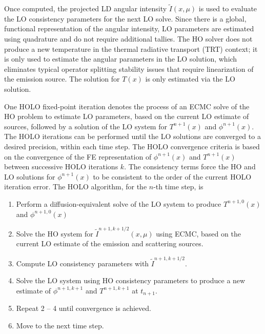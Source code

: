 \documentclass{mc2013}
\begin{document}


Once computed, the projected LD
angular intensity $\tilde{I}(x,\mu)$ is used to evaluate the LO
consistency parameters for the next LO solve.  Since there is a global, functional representation of
the angular intensity,  LO parameters are estimated using quadrature and do not require additional tallies.  The HO solver does not
produce a new temperature in the thermal radiative transport (TRT) context; it is
only used to estimate the angular parameters in the LO solution, which eliminates
typical operator splitting stability issues that require linearization of the emission source.
 The solution for $T(x)$ is only estimated via the LO solution.

One HOLO fixed-point iteration denotes the process of an ECMC solve of the HO problem to estimate LO parameters, based on
the current LO estimate of sources, followed by a solution of the 
LO system for $T^{n+1}(x)$ and $\phi^{n+1}(x)$.
The HOLO iterations can be performed until the LO solutions are converged to a
desired precision, within each time step. The HOLO convergence criteria is based on
the convergence of the FE representation of $\phi^{n+1}(x)$ and $T^{n+1}(x)$ between successive HOLO iterations
$k$.  
The consistency terms force the HO
and LO solutions for $\phi^{n+1}(x)$ to be consistent to the order of the current HOLO
iteration error.   The HOLO algorithm, for the $n$-th time step, is
\begin{enumerate}
    \item Perform a diffusion-equivalent solve of the LO system to produce $T^{n+1,0}(x)$
        and $\phi^{n+1,0}(x)$ 
\item Solve the HO system for $\tilde{I}^{n+1,k+1/2}(x,\mu)$ using ECMC, based on the current
    LO estimate of the emission and scattering sources.%
\item Compute LO consistency parameters with $\tilde{I}^{n+1,k+1/2}$.  
\item Solve the LO system using HO consistency parameters to produce a new
    estimate of $\phi^{n+1,k+1}$ and $T^{n+1,k+1}$ at $t_{n+1}$.
\item Repeat 2 -- 4 until convergence is achieved.
\item Move to the next time step.
\end{enumerate}


\end{document}
